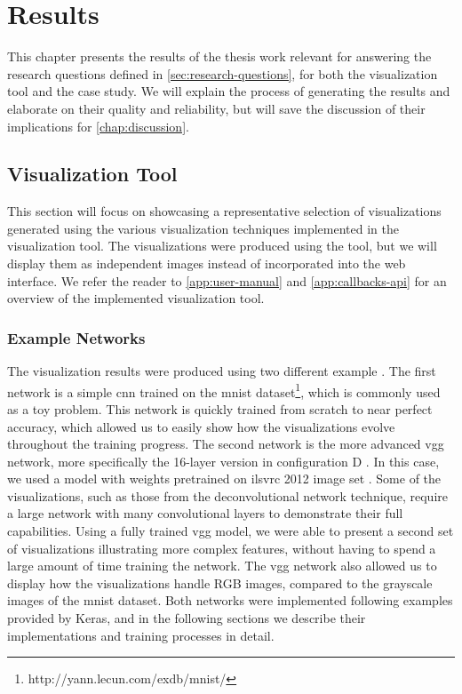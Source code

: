 
\chapter{Results} \label{chap:results}

This chapter presents the results of the thesis work relevant for answering the research questions defined in \autoref{sec:research-questions}, for both the visualization tool and the case study. We will explain the process of generating the results and elaborate on their quality and reliability, but will save the discussion of their implications for \autoref{chap:discussion}.

\section{Visualization Tool} \label{sec:visualization-tool-results}

This section will focus on showcasing a representative selection of visualizations generated using the various visualization techniques implemented in the visualization tool. The visualizations were produced using the tool, but we will display them as independent images instead of incorporated into the web interface. We refer the reader to \autoref{app:user-manual} and \autoref{app:callbacks-api} for an overview of the implemented visualization tool.

\subsection{Example Networks} \label{sec:example-networks}

The visualization results were produced using two different example . The first network is a simple \acrshort{cnn} trained on the \acrfull{mnist} dataset\footnote{http://yann.lecun.com/exdb/mnist/}, which is commonly used as a toy problem. This network is quickly trained from scratch to near perfect accuracy, which allowed us to easily show how the visualizations evolve throughout the training progress. The second network is the more advanced \acrshort{vgg} network, more specifically the 16-layer version in configuration D \cite{vgg}. In this case, we used a model with weights pretrained on \acrshort{ilsvrc} 2012 image set \cite{imagenet}. Some of the visualizations, such as those from the deconvolutional network technique, require a large network with many convolutional layers to demonstrate their full capabilities. Using a fully trained \acrshort{vgg} model, we were able to present a second set of visualizations illustrating more complex features, without having to spend a large amount of time training the network. The \acrshort{vgg} network also allowed us to display how the visualizations handle RGB images, compared to the grayscale images of the \acrshort{mnist} dataset. Both networks were implemented following examples provided by Keras, and in the following sections we describe their implementations and training processes in detail.\\


